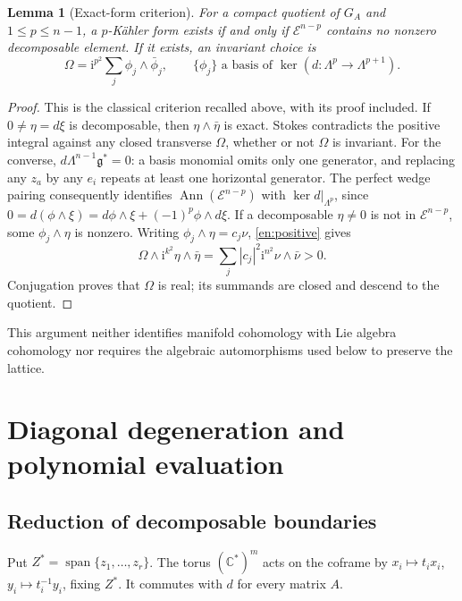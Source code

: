 \documentclass[12pt]{amsart}
\newtheorem{lem}[thm]{Lemma}
\theoremstyle{definition}
\theoremstyle{remark}
\numberwithin{equation}{section}
\newcommand{\C}{\mathbb{C}}
\newcommand{\gfr}{\mathfrak g}
\newcommand{\Eex}{\mathcal E}
\newcommand{\Span}{\operatorname{span}}
\newcommand{\Ann}{\operatorname{Ann}}
\newcommand{\ii}{\mathrm i}
\begin{document}
\begin{lem}[Exact-form criterion]\label{en:criterion}
For a compact quotient of $G_A$ and $1\leq p\leq n-1$, a $p$-K\"ahler
form exists if and only if $\Eex^{n-p}$ contains no nonzero decomposable
element. If it exists, an invariant choice is
\begin{equation}\label{en:positive}
 \Omega=\ii^{p^2}\sum_j\phi_j\wedge\bar\phi_j,
 \qquad \{\phi_j\}\text{ a basis of }\ker(d:\Lambda^p\to\Lambda^{p+1}).
\end{equation}
\end{lem}
\begin{proof}
This is the classical criterion recalled above, with its proof included.
If $0\ne\eta=d\xi$ is decomposable, then $\eta\wedge\bar\eta$
is exact. Stokes contradicts the positive integral against any closed
transverse $\Omega$, whether or not $\Omega$ is invariant.
For the converse, $d\Lambda^{n-1}\gfr^*=0$: a basis monomial omits
only one generator, and replacing any $z_a$ by any $e_i$ repeats at
least one horizontal generator. The perfect wedge pairing consequently
identifies $\Ann(\Eex^{n-p})$ with $\ker d|_{\Lambda^p}$, since
$0=d(\phi\wedge\xi)=d\phi\wedge\xi+(-1)^p\phi\wedge d\xi$.
If a decomposable $\eta\ne0$ is not in $\Eex^{n-p}$, some
$\phi_j\wedge\eta$ is nonzero. Writing $\phi_j\wedge\eta=c_j\nu$,
\eqref{en:positive} gives
\[
 \Omega\wedge\ii^{k^2}\eta\wedge\bar\eta
 =\sum_j|c_j|^2\ii^{n^2}\nu\wedge\bar\nu>0.
\]
Conjugation proves that $\Omega$ is real; its summands are closed and
descend to the quotient.
\end{proof}

This argument neither identifies manifold cohomology with Lie algebra
cohomology nor requires the algebraic automorphisms used below to
preserve the lattice.

\section{Diagonal degeneration and polynomial evaluation}
\subsection{Reduction of decomposable boundaries}
Put $Z^*=\Span\{z_1,\ldots,z_r\}$. The torus $(\C^*)^m$ acts on the
coframe by $x_i\mapsto t_i x_i$, $y_i\mapsto t_i^{-1}y_i$, fixing $Z^*$.
It commutes with $d$ for every matrix $A$.
\end{document}
